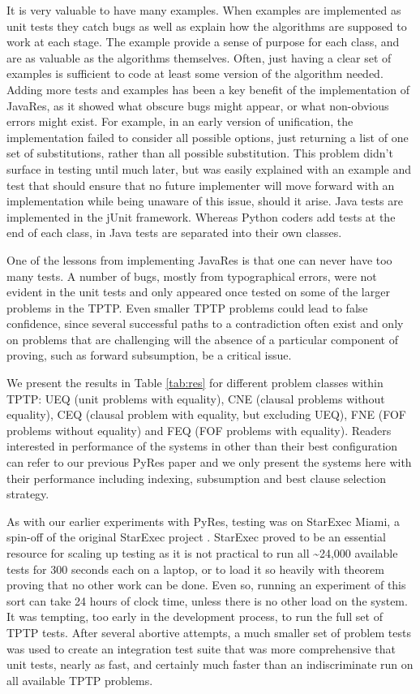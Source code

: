 \documentclass{llncs}
\begin{document}
It is very valuable to have many examples.  When examples are implemented as
unit tests they catch bugs as well as explain how the algorithms are supposed to work at each stage.
The example provide a sense of purpose for each class, and are as valuable as the algorithms
themselves.  Often, just having a clear set of examples is sufficient to code at least some version
of the algorithm needed.  Adding more tests and examples has been a key benefit of the implementation
of JavaRes, as it showed what obscure bugs might appear, or what non-obvious errors might exist.
For example, in an early version of unification, the implementation failed to consider all possible
options, just returning a list of one set of substitutions, rather than all possible substitution.
This problem didn't surface in testing until much later, but was easily explained with an example and
test that should ensure that no future implementer will move forward with an implementation while
being unaware of this issue, should it arise.  Java tests are implemented in the jUnit framework.
Whereas Python coders add tests at the end of each class, in Java tests are separated into their
own classes.

One of the lessons from implementing JavaRes is that one can never have too many tests.  A number
of bugs, mostly from typographical errors, were not evident in the unit tests and only appeared
once tested on some of the larger problems in the TPTP.  Even smaller TPTP problems could lead to
false confidence, since several successful paths to a contradiction often exist and only on
problems that are challenging will the absence of a particular component of proving, such as
forward subsumption, be a critical issue.



We present the results in Table \ref{tab:res} for different problem classes within TPTP: UEQ (unit problems with equality),
CNE (clausal problems without equality), CEQ (clausal problem with equality, but excluding UEQ),
FNE (FOF problems without equality) and FEQ (FOF problems with equality).  Readers interested
in performance of the systems in other than their best configuration can refer to our
previous PyRes paper and we only present the systems here with their performance including
indexing, subsumption and best clause selection strategy.

As with our earlier experiments with PyRes, testing was on StarExec Miami, a spin-off of the
original StarExec project \cite{SST:IJCAR-2014}. StarExec proved to be an essential resource
for scaling up testing as it is not practical to run
all \textasciitilde24,000 available tests for 300 seconds each on a laptop, or to load it so heavily with
theorem proving that no other work can be done.  Even so, running an experiment of this sort can
take 24 hours of clock time, unless there is no other load on the system. It was tempting, too
early in the development process, to run the full set of TPTP tests.  After several abortive
attempts, a much smaller set of problem tests was used to create an integration test suite that
was more comprehensive that unit tests, nearly as fast, and certainly much faster than an indiscriminate
run on all available TPTP problems.
\end{document}

